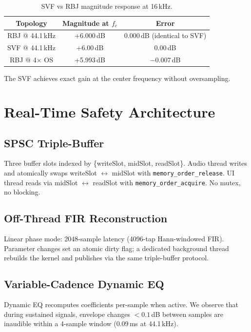 \documentclass[twoside,a4paper]{article}
\begin{document}
\begin{table}[ht]
  \caption{SVF vs RBJ magnitude response at 16\,kHz.}
  \centering
  \begin{tabular}{ccc}
    \toprule
    Topology & Magnitude at $f_c$ & Error \\
    \midrule
    RBJ @ 44.1\,kHz & +6.000\,dB & $0.000$\,dB (identical to SVF) \\
    SVF @ 44.1\,kHz & +6.00\,dB & 0.00\,dB \\
    RBJ @ 4$\times$ OS & +5.993\,dB & $-0.007$\,dB \\
    \bottomrule
  \end{tabular}
  \label{tab:svfvsrbj}
\end{table}

The SVF achieves exact gain at the center frequency without oversampling.

\section{Real-Time Safety Architecture}
\label{sec:realtime}

\subsection{SPSC Triple-Buffer}

Three buffer slots indexed by \{writeSlot, midSlot, readSlot\}. Audio thread writes and atomically swaps writeSlot $\leftrightarrow$ midSlot with \texttt{memory\_order\_release}. UI thread reads via midSlot $\leftrightarrow$ readSlot with \texttt{memory\_order\_acquire}. No mutex, no blocking.

\subsection{Off-Thread FIR Reconstruction}

Linear phase mode: 2048-sample latency (4096-tap Hann-windowed FIR). Parameter changes set an atomic dirty flag; a dedicated background thread rebuilds the kernel and publishes via the same triple-buffer protocol.

\subsection{Variable-Cadence Dynamic EQ}

Dynamic EQ recomputes coefficients per-sample when active. We observe that during sustained signals, envelope changes $< 0.1$\,dB between samples are inaudible within a 4-sample window (0.09\,ms at 44.1\,kHz).
\end{document}
